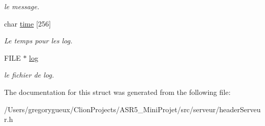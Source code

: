\begin{DoxyCompactItemize}
\begin{DoxyCompactList}\small\item\em le message. \end{DoxyCompactList}\item 
\hypertarget{group__serveur_ga964367e88bef9373b246eb37bb9c62de}{}char \hyperlink{group__serveur_ga964367e88bef9373b246eb37bb9c62de}{time} \mbox{[}256\mbox{]}\label{group__serveur_ga964367e88bef9373b246eb37bb9c62de}

\begin{DoxyCompactList}\small\item\em Le temps pour les log. \end{DoxyCompactList}\item 
\hypertarget{group__serveur_gad033d05e078fa433531dcadea106749f}{}F\+I\+L\+E $\ast$ \hyperlink{group__serveur_gad033d05e078fa433531dcadea106749f}{log}\label{group__serveur_gad033d05e078fa433531dcadea106749f}

\begin{DoxyCompactList}\small\item\em le fichier de log. \end{DoxyCompactList}\end{DoxyCompactItemize}


The documentation for this struct was generated from the following file\+:\begin{DoxyCompactItemize}
\item 
/\+Users/gregorygueux/\+Clion\+Projects/\+A\+S\+R5\+\_\+\+Mini\+Projet/src/serveur/header\+Serveur.\+h\end{DoxyCompactItemize}
